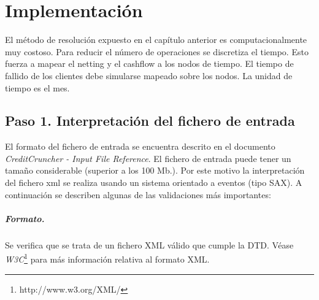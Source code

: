 
%
%
%
%
%
%
%
%

\chapter{Implementaci\'on}
\label{sec:implementation}

El m\'etodo de resoluci\'on expuesto en el cap\'itulo anterior es
computacionalmente muy costoso. Para reducir el n\'umero de operaciones
se discretiza el tiempo. Esto fuerza a mapear el netting y el cashflow
a los nodos de tiempo. El tiempo de fallido de los clientes debe
simularse mapeado sobre los nodos. La unidad de tiempo es el mes.


\section{Paso 1. Interpretaci\'on del fichero de entrada}

El formato del fichero de entrada se encuentra descrito en el
documento \emph{CreditCruncher - Input File Reference}.
\newline
\newline
El fichero de entrada puede tener un tama\~no considerable (superior
a los 100 Mb.). Por este motivo la interpretaci\'on del fichero xml se
realiza usando un sistema orientado a eventos (tipo SAX). A continuaci\'on
se describen algunas de las validaciones m\'as importantes:

\paragraph{Formato.} Se verifica que se trata de un fichero XML
v\'alido que cumple la DTD. V\'ease \emph{W3C}\footnote{http://www.w3.org/XML/}
para m\'as informaci\'on relativa al formato XML.

